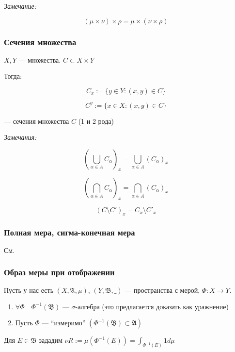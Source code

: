 \documentclass{article}
\begin{document}
\textit{Замечание: }

\[(\mu \times \nu) \times \rho = \mu \times (\nu \times \rho)\]

\subsubsection{Сечения множества}

$X, Y$ --- множества. $C \subset X \times Y$

Тогда: 

\[C_{x} := \{y \in Y: (x, y) \in C\}\]

\[C^{y} := \{x \in X: (x, y) \in C\}\]

--- сечения множества $C$ (1 и 2 рода)

\textit{Замечания: }

\[\left(\bigcup_{\alpha \in A} C_{\alpha}\right)_{x} = \bigcup_{\alpha \in A} \left(C_{\alpha}\right)_{x}\]

\[\left(\bigcap_{\alpha \in A} C_{\alpha}\right)_{x} = \bigcap_{\alpha \in A} \left(C_{\alpha}\right)_{x}\]

\[\left(C \setminus C'\right)_{x} = C_{x} \setminus C'_{x}\]

\subsubsection{Полная мера, сигма-конечная мера}

См. \href{http://gg.gg/holykpksem3}{\color{blue}{конспект прошлого семестра}}

\subsubsection{Образ меры при отображении}

Пусть у нас есть $(X, \mathfrak{A}, \mu)$, $(Y, \mathfrak{B}, \_ )$ --- пространства с мерой, $\Phi: X \rightarrow Y$.

\begin{enumerate}
    \item $\forall \Phi \quad \Phi^{-1}(\mathfrak{B})$ --- $\sigma$-алгебра (это предлагается доказать как уражнение)
    \item Пусть $\Phi$ --- ``измеримо'' $\left(\Phi^{-1}(\mathfrak{B}) \subset \mathfrak{A}\right)$
\end{enumerate}

Для $E \in \mathfrak{B}$ зададим $\nu R := \mu\left(\Phi^{-1}(E)\right) = \int_{\Phi^{-1}(E)} 1 d \mu$
\end{document}
